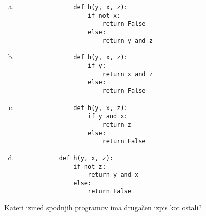 \documentclass[arhiv, 10pt]{../izpit}
\begin{document}
        \begin{multicols}{2}
        \begin{enumerate}[(a)]
\item 
                \begin{verbatim}
                def h(y, x, z):
                    if not x:
                        return False
                    else:
                        return y and z
                \end{verbatim}
            
\item 
                \begin{verbatim}
                def h(y, x, z):
                    if y:
                        return x and z
                    else:
                        return False
                \end{verbatim}
            
\item 
                \begin{verbatim}
                def h(y, x, z):
                    if y and x:
                        return z
                    else:
                        return False
                \end{verbatim}
            
\item 
            \begin{verbatim}
            def h(y, x, z):
                if not z:
                    return y and x
                else:
                    return False
            \end{verbatim}
        
\end{enumerate}

        \end{multicols}
    
        \naloga*
        
        Kateri izmed spodnjih programov ima drugačen izpis kot ostali?
    
\end{document}
